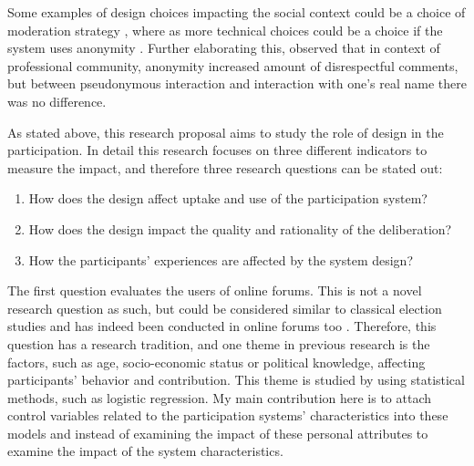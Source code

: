 \documentclass{article}
\begin{document}
Some examples of design choices impacting the social context could be a choice of moderation strategy \cite{wright07}, where as more technical choices could be a choice if the system uses anonymity \cite{kilner05}. Further elaborating this,  observed that in context of professional community, anonymity increased amount of disrespectful comments, but between pseudonymous interaction and interaction with one's real name there was no difference. %

As stated above, this research proposal aims to study the role of design in the participation. In detail this research focuses on three different indicators to measure the impact, and therefore three research questions can be stated out:

\begin{enumerate}
\item How does the design affect uptake and use of the participation system?
\item How does the design impact the quality and rationality of the deliberation?
\item How the participants' experiences are affected by the system design?
\end{enumerate}

The first question evaluates the users of online forums. This is not a novel research question as such, but could be considered similar to classical election studies and has indeed been conducted in online forums too . Therefore, this question has a research tradition, and one theme in previous research is the factors, such as age, socio-economic status or political knowledge, affecting participants' behavior and contribution. This theme is studied by using statistical methods, such as logistic regression. My main contribution here is to attach control variables related to the participation systems' characteristics into these models and instead of examining the impact of these personal attributes to examine the impact of the system characteristics.
\end{document}
